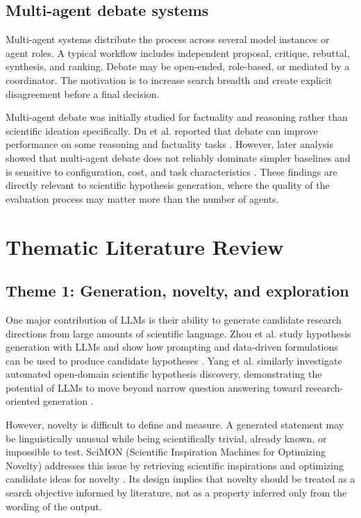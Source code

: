 \documentclass[11pt]{article}
\begin{document}
\subsection{Multi-agent debate systems}
\label{subsec:multi-agent}

Multi-agent systems distribute the process across several model instances or agent roles. A typical
workflow includes independent proposal, critique, rebuttal, synthesis, and ranking. Debate may be
open-ended, role-based, or mediated by a coordinator. The motivation is to increase search breadth
and create explicit disagreement before a final decision.

Multi-agent debate was initially studied for factuality and reasoning rather than scientific ideation
specifically. Du et al. reported that debate can improve performance on some reasoning and
factuality tasks \cite{du2024improving}. However, later analysis showed that multi-agent debate does
not reliably dominate simpler baselines and is sensitive to configuration, cost, and task
characteristics \cite{smit2024mad}. These findings are directly relevant to scientific hypothesis
generation, where the quality of the evaluation process may matter more than the number of agents.

\section{Thematic Literature Review}
\label{sec:thematic-literature-review}

\subsection{Theme 1: Generation, novelty, and exploration}
\label{subsec:generation-novelty-exploration}

One major contribution of LLMs is their ability to generate candidate research directions from large
amounts of scientific language. Zhou et al. study hypothesis generation with LLMs and show how
prompting and data-driven formulations can be used to produce candidate hypotheses
\cite{zhou2024hypothesis}. Yang et al. similarly investigate automated open-domain scientific
hypothesis discovery, demonstrating the potential of LLMs to move beyond narrow question
answering toward research-oriented generation \cite{yang2024large}.

However, novelty is difficult to define and measure. A generated statement may be linguistically
unusual while being scientifically trivial, already known, or impossible to test. SciMON (Scientific
Inspiration Machines for Optimizing Novelty) addresses this issue by retrieving scientific inspirations
and optimizing candidate ideas for novelty \cite{wang2024scimon}. Its design implies that novelty
should be treated as a search objective informed by literature, not as a property inferred only from
the wording of the output.
\end{document}
